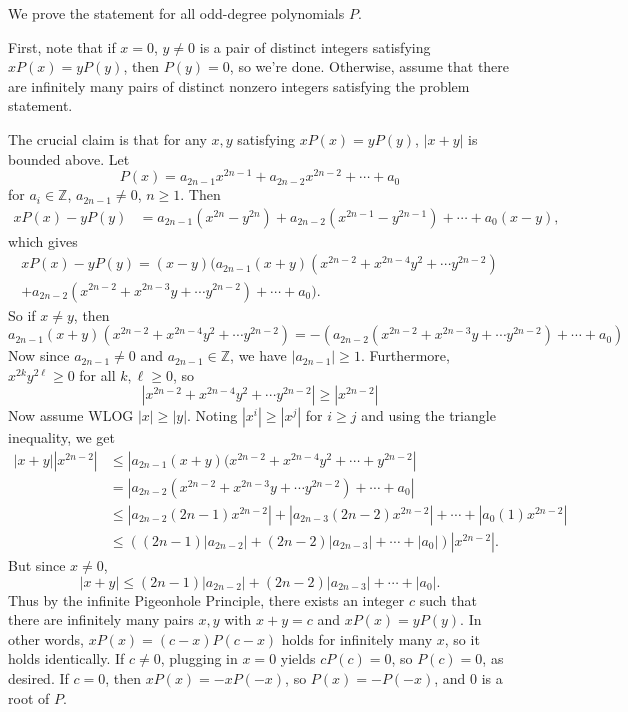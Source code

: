 \documentclass[11pt]{article}
\theoremstyle{definition}
\begin{document}
\begin{solution}[name={Solution by pi37}]
	We prove the statement for all odd-degree polynomials $P$.
	
	First, note that if $x=0$, $y\neq0$ is a pair of distinct integers satisfying $xP(x)=yP(y)$, then $P(y)=0$, so we're done. Otherwise, assume that there are infinitely many pairs of distinct nonzero integers satisfying the problem statement.
	
	The crucial claim is that for any $x,y$ satisfying $xP(x)=yP(y)$, $|x+y|$ is bounded above. Let
	\[
	P(x)=a_{2n-1}x^{2n-1}+a_{2n-2}x^{2n-2}+\cdots + a_0
	\]for $a_i\in \mathbb{Z}$, $a_{2n-1}\neq 0$, $n\ge 1$. Then
	\begin{align*}
		xP(x)-yP(y)&=a_{2n-1}(x^{2n}-y^{2n})+a_{2n-2}(x^{2n-1}-y^{2n-1})+\cdots + a_0(x-y),
	\end{align*}
	which gives
	\begin{multline*}
		xP(x)-yP(y)=(x-y)(a_{2n-1}(x+y)(x^{2n-2}+x^{2n-4}y^2+\cdots y^{2n-2}) \\ +a_{2n-2}(x^{2n-2}+x^{2n-3}y+\cdots y^{2n-2})+\cdots + a_0).
	\end{multline*}
	So if $x\neq y$, then
	\[
	a_{2n-1}(x+y)(x^{2n-2}+x^{2n-4}y^2+\cdots y^{2n-2})=-(a_{2n-2}(x^{2n-2}+x^{2n-3}y+\cdots y^{2n-2})+\cdots + a_0)
	\]Now since $a_{2n-1}\neq 0$ and $a_{2n-1}\in \mathbb{Z}$, we have $|a_{2n-1}|\ge 1$. Furthermore, $x^{2k}y^{2\ell}\ge 0$ for all $k,\ell \ge 0$, so
	\[
	|x^{2n-2}+x^{2n-4}y^2+\cdots y^{2n-2}|\ge |x^{2n-2}|
	\]Now assume WLOG $|x|\ge |y|$. Noting $|x^i|\ge |x^j|$ for $i\ge j$ and using the triangle inequality, we get
	\begin{align*}
		|x+y||x^{2n-2}|&\le |a_{2n-1}(x+y)(x^{2n-2}+x^{2n-4}y^2+\cdots + y^{2n-2}|\\
		&=|a_{2n-2}(x^{2n-2}+x^{2n-3}y+\cdots y^{2n-2})+\cdots + a_0|\\
		&\le |a_{2n-2}(2n-1)x^{2n-2}|+|a_{2n-3}(2n-2)x^{2n-2}|+\cdots+|a_0(1)x^{2n-2}|\\
		&\le ((2n-1)|a_{2n-2}|+(2n-2)|a_{2n-3}|+\cdots + |a_0|)|x^{2n-2}|.
	\end{align*}But since $x\neq 0$,
	\[
	|x+y|\le (2n-1)|a_{2n-2}|+(2n-2)|a_{2n-3}|+\cdots + |a_0|.
	\]Thus by the infinite Pigeonhole Principle, there exists an integer $c$ such that there are infinitely many pairs $x,y$ with $x+y=c$ and $xP(x)=yP(y)$. In other words, $xP(x)=(c-x)P(c-x)$ holds for infinitely many $x$, so it holds identically.	If $c\neq 0$, plugging in $x=0$ yields $cP(c)=0$, so $P(c)=0$, as desired. If $c=0$, then $xP(x)=-xP(-x)$, so $P(x)=-P(-x)$, and $0$ is a root of $P$.
\end{solution}
\end{document}
